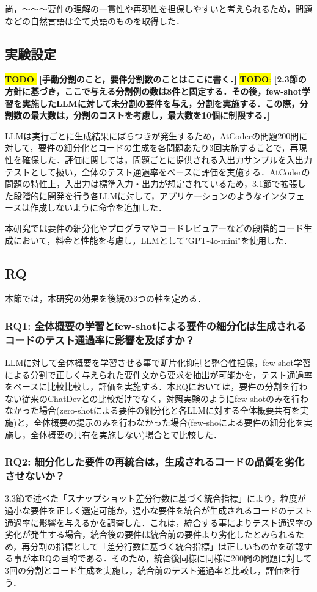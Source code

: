 \documentclass[submit,techrep,noauthor]{ipsj}
\newcommand{\todo}[1]{\colorbox{yellow}{{\bf TODO}:}{\color{red} {\textbf{[#1]}}}}
\begin{document}
尚，〜〜〜要件の理解の一貫性や再現性を担保しやすいと考えられるため，問題などの自然言語は全て英語のものを取得した．

\subsection{実験設定}
\todo{手動分割のこと，要件分割数のことはここに書く．}
\todo{2.3節の方針に基づき，ここで与える分割例の数は8件と固定する．その後，few-shot学習を実施したLLMに対して未分割の要件を与え，分割を実施する．この際，分割数の最大数は，分割のコストを考慮し，最大数を10個に制限する．}

LLMは実行ごとに生成結果にばらつきが発生するため，AtCoderの問題200問に対して，要件の細分化とコードの生成を各問題あたり3回実施することで，再現性を確保した．評価に関しては，問題ごとに提供される入出力サンプルを入出力テストとして扱い，全体のテスト通過率をベースに評価を実施する．AtCoderの問題の特性上，入出力は標準入力・出力が想定されているため，3.1節で拡張した段階的に開発を行う各LLMに対して，アプリケーションのようなインタフェースは作成しないように命令を追加した．

本研究では要件の細分化やプログラマやコードレビュアーなどの段階的コード生成において，料金と性能を考慮し，LLMとして"GPT-4o-mini"\cite{openai_gpt_4o_mini}を使用した．


\subsection{RQ}
本節では，本研究の効果を後続の3つの軸を定める．

\subsubsection{RQ1: 全体概要の学習とfew-shotによる要件の細分化は生成されるコードのテスト通過率に影響を及ぼすか？}
LLMに対して全体概要を学習させる事で断片化抑制と整合性担保，few-shot学習による分割で正しく与えられた要件文から要求を抽出が可能かを，テスト通過率をベースに比較比較し，評価を実施する．本RQにおいては，要件の分割を行わない従来のChatDevとの比較だけでなく，対照実験のようにfew-shotのみを行わなかった場合(zero-shotによる要件の細分化と各LLMに対する全体概要共有を実施)と，全体概要の提示のみを行わなかった場合(few-shoによる要件の細分化を実施し，全体概要の共有を実施しない)場合とで比較した．

\subsubsection{RQ2: 細分化した要件の再統合は，生成されるコードの品質を劣化させないか？}
3.3節で述べた「スナップショット差分行数に基づく統合指標」により，粒度が過小な要件を正しく選定可能か，過小な要件を統合が生成されるコードのテスト通過率に影響を与えるかを調査した．これは，統合する事によりテスト通過率の劣化が発生する場合，統合後の要件は統合前の要件より劣化したとみられるため，再分割の指標として「差分行数に基づく統合指標」は正しいものかを確認する事が本RQの目的である．そのため，統合後同様に同様に200問の問題に対して3回の分割とコード生成を実施し，統合前のテスト通過率と比較し，評価を行う．
\end{document}
